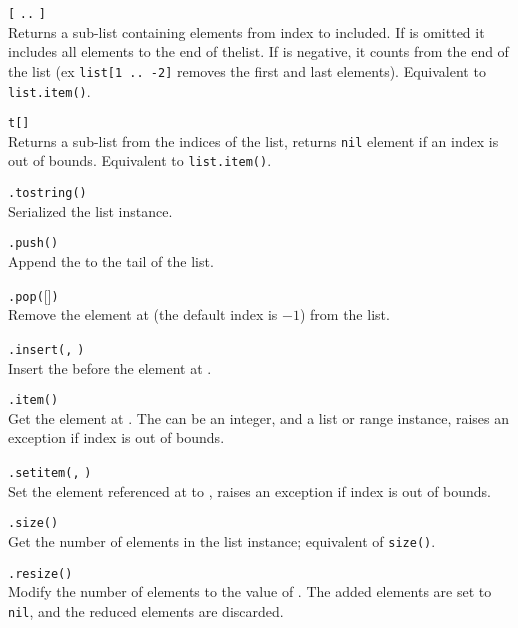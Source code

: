 \hangpar  {}\texttt{[} \texttt{..} \texttt{]}\\
Returns a sub-list containing elements from index  to  included. If  is omitted it includes all elements to the end of thelist. If  is negative, it counts from the end of the list (ex \texttt{list[1 .. -2]} removes the first and last elements). Equivalent to \texttt{list.item()}.

\hangpar  {}\texttt{t[}\texttt{]}\\
Returns a sub-list from the indices of the list, returns \texttt{nil} element if an index is out of bounds. Equivalent to \texttt{list.item()}.

\hangpar {}\texttt{.tostring()}\\
Serialized the list instance.

\hangpar {}\texttt{.push(}\texttt{)}\\
Append the  to the tail of the list.

\hangpar {}\texttt{.pop(}[]\texttt{)}\\
Remove the element at  (the default index is $-1$) from the list.

\hangpar {}\texttt{.insert(}\texttt{,} \texttt{)}\\
Insert the  before the element at .

\hangpar {}\texttt{.item(}\texttt{)}\\
Get the element at . The  can be an \textsf{integer}, and a \textsf{list} or \textsf{range} instance, raises an exception if index is out of bounds.

\hangpar {}\texttt{.setitem(}\texttt{,} \texttt{)}\\
Set the element referenced at  to , raises an exception if index is out of bounds.

\hangpar {}\texttt{.size()}\\
Get the number of elements in the list instance; equivalent of \texttt{size(}\texttt{)}.

\hangpar {}\texttt{.resize(}\texttt{)}\\
Modify the number of elements to the value of . The added elements are set to \texttt{nil}, and the reduced elements are discarded.

